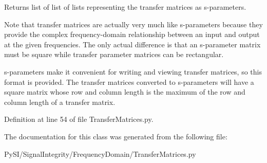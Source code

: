 \begin{DoxyReturn}{Returns}
list of list of lists representing the transfer matrices as s-\/parameters. 
\end{DoxyReturn}
\begin{DoxyNote}{Note}
that transfer matrices are actually very much like s-\/parameters because they provide the complex frequency-\/domain relationship between an input and output at the given frequencies. The only actual difference is that an s-\/parameter matrix must be square while transfer parameter matrices can be rectangular.
\end{DoxyNote}
s-\/parameters make it convenient for writing and viewing transfer matrices, so this format is provided. The transfer matrices converted to s-\/parameters will have a square matrix whose row and column length is the maximum of the row and column length of a transfer matrix. 

Definition at line 54 of file Transfer\+Matrices.\+py.



The documentation for this class was generated from the following file\+:\begin{DoxyCompactItemize}
\item 
Py\+S\+I/\+Signal\+Integrity/\+Frequency\+Domain/Transfer\+Matrices.\+py\end{DoxyCompactItemize}
